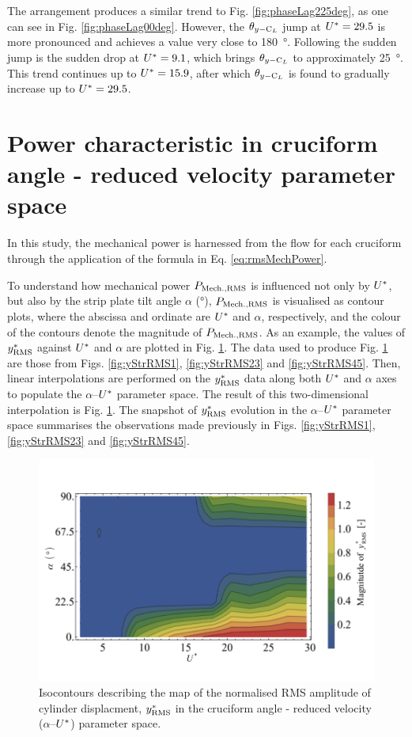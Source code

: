 \documentclass[oneside]{utmthesis}
\begin{document}
The \angon{} arrangement produces a similar trend to Fig. \ref{fig:phaseLag225deg}, as one can see in Fig. \ref{fig:phaseLag00deg}. However, the $\theta_{y-\text{C}_{L}}$ jump at  $U^{*} =29.5$ is more pronounced and achieves a value very close to \SI{180}{\degree}. Following the sudden jump is the sudden drop at $U^{*} = 9.1$, which brings $\theta_{y-\text{C}_{L}}$ to approximately \SI{25}{\degree}. This trend continues up to $U^{*} = 15.9$, after which $\theta_{y-\text{C}_{L}}$ is found to gradually increase up to $U^{*} = 29.5$.

\section{Power characteristic in cruciform angle - reduced velocity parameter space}\label{sec:powerCharacteristic}
In this study, the mechanical power is harnessed from the flow for each cruciform through the application of the formula in Eq. \ref{eq:rmsMechPower}.

To understand how mechanical power $P_{\text{Mech.,RMS}}$ is influenced not only by $U^{*}$, but also by the strip plate tilt angle $\alpha$ (\si{\degree}), $P_{\text{Mech.,RMS}}$ is visualised as contour plots, where the abscissa and ordinate are $U^{*}$ and $\alpha$, respectively, and the colour of the contours denote the magnitude of $P_{\text{Mech.,RMS}}$. As an example, the values of $y^{*}_{\text{RMS}}$ against $U^{*}$ and $\alpha$ are plotted in Fig. \ref{fig:yRMSContour}. The data used to produce Fig. \ref{fig:yRMSContour} are those from Figs. \ref{fig:yStrRMS1}, \ref{fig:yStrRMS23} and \ref{fig:yStrRMS45}. Then, linear interpolations are performed on the $y^{*}_{\text{RMS}}$ data along both $U^{*}$ and $\alpha$ axes to populate the $\alpha$--$U^{*}$ parameter space. The result of this two-dimensional interpolation is Fig. \ref{fig:yRMSContour}. The snapshot of $y^{*}_{\text{RMS}}$ evolution in the $\alpha$--$U^{*}$ parameter space summarises the observations made previously in Figs. \ref{fig:yStrRMS1}, \ref{fig:yStrRMS23} and \ref{fig:yStrRMS45}.

\begin{figure}[H]
  \centering
  \includegraphics[width=1\textwidth]{figs/yRMSContour}
  \caption{Isocontours describing the map of the normalised RMS amplitude of cylinder displacment, $y^{*}_{\text{RMS}}$ in the cruciform angle - reduced velocity ($\alpha$--$U^{*}$) parameter space.}
  \label{fig:yRMSContour}
\end{figure}
\end{document}
